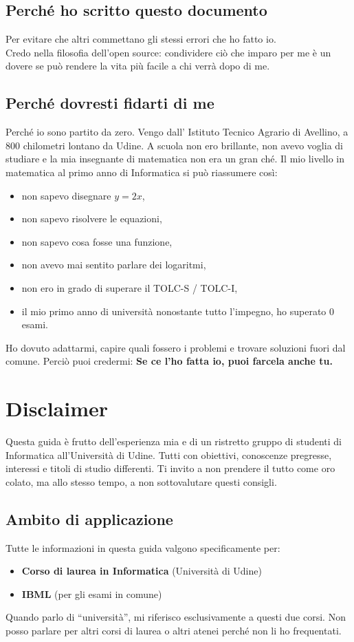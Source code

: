\documentclass[18pt]{extarticle}
\begin{document}
\subsection{Perché ho scritto questo documento}
Per evitare che altri commettano gli stessi errori che ho fatto io.\\  
Credo nella filosofia dell’open source: condividere ciò che imparo per me è un dovere se può rendere la vita più facile a chi verrà dopo di me.

\subsection{Perché dovresti fidarti di me}
Perché io sono partito da zero.  
Vengo dall' Istituto Tecnico Agrario di Avellino, a 800 chilometri lontano da Udine. 
A scuola non ero brillante, non avevo voglia di studiare e la mia insegnante di matematica non era un gran ché.  
Il mio livello in matematica al primo anno di Informatica si può riassumere così:
\begin{itemize}
    \item non sapevo disegnare $y = 2x$,
    \item non sapevo risolvere le equazioni,
    \item non sapevo cosa fosse una funzione,
    \item non avevo mai sentito parlare dei logaritmi,
    \item non ero in grado di superare il TOLC-S / TOLC-I, 
    \item il mio primo anno di università nonostante tutto l'impegno, ho superato 0 esami. 
\end{itemize}%
Ho dovuto adattarmi, capire quali fossero i problemi e trovare soluzioni fuori dal comune. 
Perciò puoi credermi: \textbf{Se ce l'ho fatta io, puoi farcela anche tu.}

\clearpage
\section{Disclaimer}
Questa guida è frutto dell'esperienza mia e di un ristretto gruppo di studenti di Informatica all'Università di Udine. Tutti con obiettivi, conoscenze pregresse, interessi e titoli di studio differenti.
Ti invito a non prendere il tutto come oro colato, ma allo stesso tempo, a non sottovalutare questi consigli.


\subsection{Ambito di applicazione}
Tutte le informazioni in questa guida valgono specificamente per:
\begin{itemize}
    \item \textbf{Corso di laurea in Informatica} (Università di Udine)
    \item \textbf{IBML} (per gli esami in comune)
\end{itemize}
Quando parlo di ``università'', mi riferisco esclusivamente a questi due corsi. Non posso parlare per altri corsi di laurea o altri atenei perché non li ho frequentati.
\end{document}
